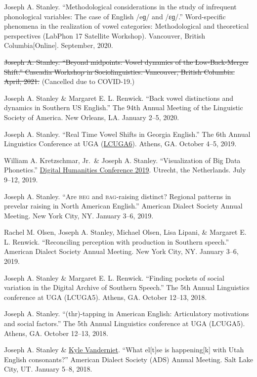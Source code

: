 \documentclass[
]{article}
\begin{document}
{Joseph A. Stanley}. ``Methodological considerations in the study of
infrequent phonological variables: The case of English /eɡ/ and /ɛɡ/.''
Word-specific phenomena in the realization of vowel categories:
Methodological and theoretical perspectives (LabPhon 17 Satellite
Workshop). Vancouver, British Columbia{[}Online{]}. September, 2020.

\st{{Joseph A. Stanley}. ``Beyond midpoints: Vowel dynamics of the
Low-Back-Merger Shift.'' Cascadia Workshop in Sociolinguistics.
Vancouver, British Columbia. April, 2021.} (Cancelled due to COVID-19.)

{Joseph A. Stanley} \& Margaret E. L. Renwick. ``Back vowel distinctions
and dynamics in Southern US English.'' The 94th Annual Meeting of the
Linguistic Society of America. New Orleans, LA. January 2--5, 2020.

{Joseph A. Stanley}. ``Real Time Vowel Shifts in Georgia English.'' The
6th Annual Linguistics Conference at UGA
(\href{http://linguistics.uga.edu/lcuga-6}{LCUGA6}). Athens, GA. October
4--5, 2019.

William A. Kretzschmar, Jr.~\& {Joseph A. Stanley}. ``Visualization of
Big Data Phonetics.'' \href{https://dh2019.adho.org}{Digital Humanities
Conference 2019}. Utrecht, the Netherlands. July 9--12, 2019.

{Joseph A. Stanley}. ``Are \textsc{beg} and \textsc{bag}-raising
distinct? Regional patterns in prevelar raising in North American
English.'' American Dialect Society Annual Meeting. New York City, NY.
January 3--6, 2019.

Rachel M. Olsen, {Joseph A. Stanley}, Michael Olsen, Lisa Lipani, \&
Margaret E. L. Renwick. ``Reconciling perception with production in
Southern speech.'' American Dialect Society Annual Meeting. New York
City, NY. January 3--6, 2019.

{Joseph A. Stanley} \& Margaret E. L. Renwick. ``Finding pockets of
social variation in the Digital Archive of Southern Speech.'' The 5th
Annual Linguistics conference at UGA (LCUGA5). Athens, GA. October
12--13, 2018.

{Joseph A. Stanley}. ``(thr)-tapping in American English: Articulatory
motivations and social factors.'' The 5th Annual Linguistics conference
at UGA (LCUGA5). Athens, GA. October 12--13, 2018.

{Joseph A. Stanley} \& \href{https://clyguy.wixsite.com/profile}{Kyle
Vanderniet}. ``What el{[}t{]}se is happening{[}k{]} with Utah English
consonants?'' American Dialect Society (ADS) Annual Meeting. Salt Lake
City, UT. January 5--8, 2018.
\end{document}
